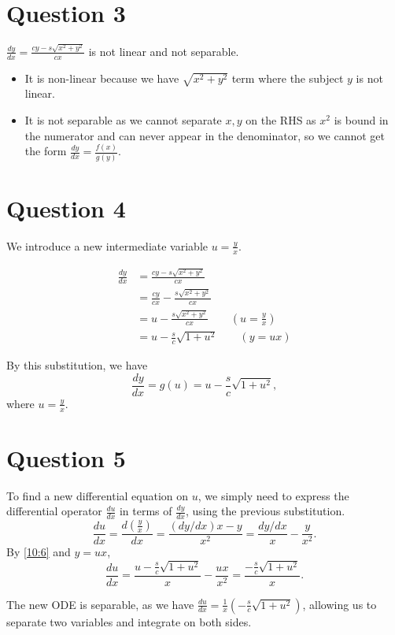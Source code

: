 \documentclass[12pt,a4paper]{article}
\begin{document}
\section*{Question 3}
\begin{solution}
$\frac{dy}{dx} = \frac{cy-s\sqrt{x^2+y^2}}{cx}$ is not linear and not separable.
\begin{itemize}
    \item It is non-linear because we have $\sqrt{x^2+y^2}$ term where the subject $y$ is not linear.
    \item It is not separable as we cannot separate $x, y$ on the RHS as $x^2$ is bound in the numerator and can never appear in the denominator, so we cannot get the form $\frac{dy}{dx}=\frac{f(x)}{g(y)}$.
\end{itemize}


\end{solution}

\section*{Question 4}
\begin{solution}
We introduce a new intermediate variable $u  = \frac{y}{x}$.

\[
\begin{aligned}
    \frac{dy}{dx} &= \frac{cy-s\sqrt{x^2+y^2}}{cx}\\
    &= \frac{cy}{cx} - \frac{s\sqrt{x^2+y^2}}{cx}\\
    &=u - \frac{s\sqrt{x^2+y^2}}{cx} \qquad (u=\frac{y}{x})\\
    &=u - \frac{s}{c}\sqrt{1+u^2} \qquad (y=ux)
\end{aligned}
\]

By this substitution, we have 
\begin{equation}\label{10:6}
    \frac{dy}{dx} = g(u) = u - \frac{s}{c}\sqrt{1+u^2},
\end{equation}
where $u = \frac{y}{x}$.

\end{solution}

\section*{Question 5}
\begin{solution}
To find a new differential equation on $u$, we simply need to express the differential operator $\frac{du}{dx}$ in terms of $\frac{dy}{dx}$, using the previous substitution.
\[
\frac{du}{dx} = \frac{d\left(\frac{y}{x}\right)}{dx} = \frac{(dy/dx)x-y}{x^2} = \frac{dy/dx}{x}-\frac{y}{x^2}.
\]
By \eqref{10:6} and $y = ux$,
\[
\frac{d u}{d x}=\frac{u-\frac{s}{c} \sqrt{1+u^2}}{x}-\frac{u x}{x^2}=\frac{-\frac{s}{c} \sqrt{1+u^2}}{x}.
\]

The new ODE is separable, as we have $\frac{du}{dx} = \frac{1}{x}\left(-\frac{s}{c}\sqrt{1+u^2}\right)$, allowing us to separate two variables and integrate on both sides.

\end{solution}
\end{document}
